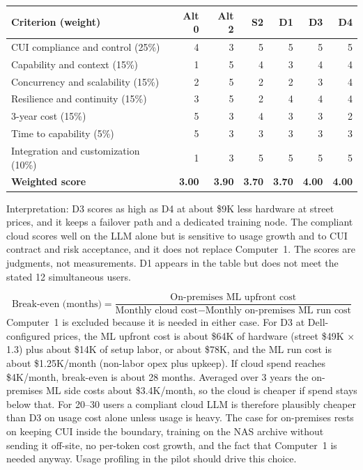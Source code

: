 
{\small
\begin{xltabular}{\textwidth}{@{}Y{1.0} r r r r r r@{}}
  \toprule
  Criterion (weight) & Alt 0 & Alt 2 & S2 & D1 & D3 & D4 \\
  \midrule
  \endhead
  CUI compliance and control (25\%) & 4 & 3 & 5 & 5 & 5 & 5 \\
  Capability and context (15\%) & 1 & 5 & 4 & 3 & 4 & 4 \\
  Concurrency and scalability (15\%) & 2 & 5 & 2 & 2 & 3 & 4 \\
  Resilience and continuity (15\%) & 3 & 5 & 2 & 4 & 4 & 4 \\
  3-year cost (15\%) & 5 & 3 & 4 & 3 & 3 & 2 \\
  Time to capability (5\%) & 5 & 3 & 3 & 3 & 3 & 3 \\
  Integration and customization (10\%) & 1 & 3 & 5 & 5 & 5 & 5 \\
  \midrule
  \textbf{Weighted score} & \textbf{3.00} & \textbf{3.90} & \textbf{3.70} & \textbf{3.70} & \textbf{4.00} & \textbf{4.00} \\
  \bottomrule
\end{xltabular}}

Interpretation: D3 scores as high as D4 at about \$9K less hardware at street prices, and it keeps a
failover path and a dedicated training node. The compliant cloud scores well on the
LLM alone but is sensitive to usage growth and to CUI contract and risk acceptance,
and it does not replace Computer~1. The scores are judgments, not measurements. D1 appears
in the table but does not meet the stated 12 simultaneous users.

\[
  \text{Break-even (months)} = \frac{\text{On-premises ML upfront cost}}{\text{Monthly cloud cost} - \text{Monthly on-premises ML run cost}}
\]
Computer~1 is excluded because it is needed in either case. For D3 at Dell-configured
prices, the ML upfront cost is about \$64K of hardware (street \$49K $\times$ 1.3) plus
about \$14K of setup labor, or about \$78K, and the ML run cost is about \$1.25K/month
(non-labor opex plus upkeep). If cloud spend reaches \$4K/month, break-even is about
28 months. Averaged over 3 years the on-premises ML side costs about \$3.4K/month, so the
cloud is cheaper if spend stays below that. For 20--30 users a compliant cloud LLM is
therefore plausibly cheaper than D3 on usage cost alone unless usage is heavy. The case
for on-premises rests on keeping CUI inside the boundary, training on the NAS archive
without sending it off-site, no per-token cost growth, and the fact that Computer~1 is
needed anyway. Usage profiling in the pilot should drive this choice.


